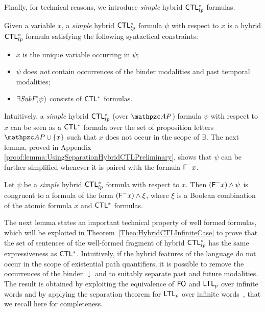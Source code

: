 Finally, for technical reasons, we introduce \emph{simple} hybrid $\text{\sffamily CTL$^{*}_{lp}$}$ formulas.
%
\begin{definition} Given a variable $x$, a \emph{simple} hybrid $\text{\sffamily CTL$^{*}_{lp}$}$ formula $\psi$ with respect to $x$  is a hybrid $\text{\sffamily CTL$^{*}_{lp}$}$ formula satisfying the following syntactical constraints:
\begin{itemize}
    \item $x$ is the unique variable occurring in $\psi$; 
    \item $\psi$ does \emph{not} contain occurrences of the binder modalities and past temporal modalities;
    \item $\exists\textit{SubF}(\psi)$ consists of $\text{\sffamily CTL$^{*}$}$ formulas.
\end{itemize}
\end{definition}

Intuitively, a \emph{simple} hybrid $\text{\sffamily CTL$^{*}_{lp}$}$ (over $\Prop$) formula $\psi$ with respect to $x$  can be seen as a $\text{\sffamily CTL$^{*}$}$ formula over the set of proposition letters $\Prop\cup \{x\}$ such that $x$ does not occur in the scope of $\exists$. The next lemma,
proved in Appendix \ref{proof:lemma:UsingSeparationHybridCTLPreliminary}, shows that $\psi$ can be further simplified whenever it is paired with the formula $\textsf{F}^{-} x$.

\begin{lemma}\label{lemma:UsingSeparationHybridCTLPreliminary} 
Let $\psi$ be  a \emph{simple} hybrid $\text{\sffamily CTL$^{*}_{lp}$}$ formula  with respect to $x$. 
Then $(\textsf{F}^{-} x)\wedge \psi$ is congruent to a formula of the form $(\textsf{F}^{-} x)\wedge \xi$, where $\xi$ is a Boolean combination of the atomic formula $x$ and $\text{\sffamily CTL$^{*}$}$ formulas. 
\end{lemma}

The next lemma states an important technical property of  well formed formulas, which will be exploited in 
Theorem~\ref{Theo:HybridCTLInfiniteCase} to prove that the set of sentences of the well-formed fragment of hybrid $\text{\sffamily CTL$^{*}_{lp}$}$ has the same expressiveness as $\text{\sffamily CTL$^{*}$}$. Intuitively, if the hybrid features of the language do not occur in the scope of existential path quantifiers, it is possible to remove the occurrences of the binder $\downarrow$ and to suitably separate past and future modalities. The result is obtained by exploiting the equivalence of $\text{\sffamily FO}$ and $\text{\sffamily LTL$_p$}$ over infinite words and by applying the separation theorem for $\text{\sffamily LTL$_p$}$ over infinite words~\cite{Gabbay87}, that we recall here for completeness. 


